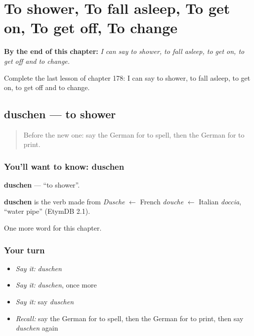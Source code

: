 
\chapter{To shower, To fall asleep, To get on, To get off, To change}
\label{ch:ge-to-shower-to-fall-asleep-to-get-on-to-get-off-to-change}

\begin{chapteropening}
\textbf{By the end of this chapter:} \emph{I can say to shower, to fall asleep, to get on, to get off and to change.}

Complete the last lesson of chapter 178: I can say to shower, to fall asleep, to get on, to get off and to change.
\end{chapteropening}

\section[duschen]{duschen — to shower}

\label{lesson:GE-C178-duschen}



\begin{quote}
Before the new one: say the German for to spell, then the German for to print.
\end{quote}

\subsection*{You'll want to know: duschen}
\textbf{duschen} — \textquotedblleft{}to shower\textquotedblright{}.

\begin{cousinweb}
\textbf{duschen} is the verb made from \emph{Dusche} $\leftarrow$ French \emph{douche} $\leftarrow$ Italian \emph{doccia}, \textquotedblleft{}water pipe\textquotedblright{} (EtymDB 2.1).
\end{cousinweb}

\begin{grammarlens}[title={What you've built}]
One more word for this chapter.
\end{grammarlens}

\subsection*{Your turn}
\begin{itemize}
\raggedright
  \item \emph{Say it:} \emph{duschen}
  \item \emph{Say it:} \emph{duschen}, once more
  \item \emph{Say it:} say \emph{duschen}
  \item \emph{Recall:} say the German for to spell, then the German for to print, then say \emph{duschen} again
\end{itemize}

